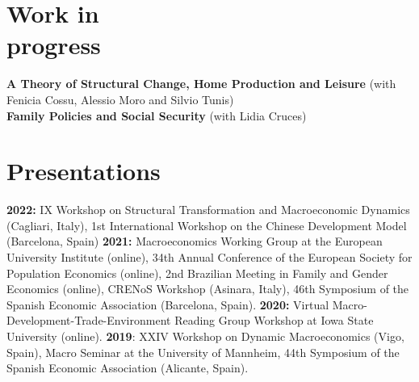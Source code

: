 \documentclass[margin]{res} %
\begin{document}
\begin{resume}

\section{Work in \\ progress}
{\bf A Theory of Structural Change, Home Production and Leisure} (with Fenicia Cossu, Alessio Moro and Silvio Tunis) \\
{\bf Family Policies and Social Security} (with Lidia Cruces)

\section{Presentations}

{\bf 2022:} IX Workshop on Structural Transformation and Macroeconomic Dynamics (Cagliari, Italy), 1st International Workshop on the Chinese Development Model (Barcelona, Spain) {\bf 2021:} Macroeconomics Working Group at the European University Institute (online), 34th Annual Conference of the European Society for Population Economics (online), 2nd Brazilian Meeting in Family and Gender Economics (online), CRENoS Workshop (Asinara, Italy), 46th Symposium of the Spanish Economic Association (Barcelona, Spain). {\bf 2020:} Virtual Macro-Development-Trade-Environment Reading Group Workshop at Iowa State University (online). {\bf 2019}: XXIV Workshop on Dynamic Macroeconomics (Vigo, Spain), Macro Seminar at the University of Mannheim, 44th Symposium of the Spanish Economic Association (Alicante, Spain).



\end{resume}
\end{document}
